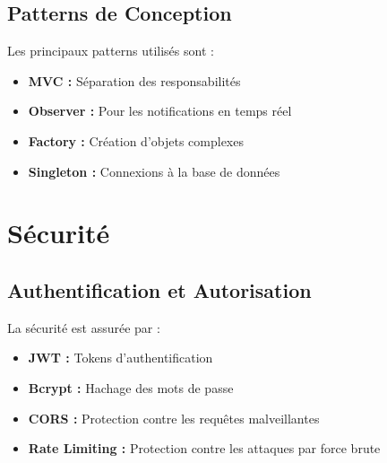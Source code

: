 \subsection{Patterns de Conception}
Les principaux patterns utilisés sont :

\begin{itemize}
    \item \textbf{MVC :} Séparation des responsabilités
    \item \textbf{Observer :} Pour les notifications en temps réel
    \item \textbf{Factory :} Création d'objets complexes
    \item \textbf{Singleton :} Connexions à la base de données
\end{itemize}

\section{Sécurité}
\subsection{Authentification et Autorisation}
La sécurité est assurée par :

\begin{itemize}
    \item \textbf{JWT :} Tokens d'authentification
    \item \textbf{Bcrypt :} Hachage des mots de passe
    \item \textbf{CORS :} Protection contre les requêtes malveillantes
    \item \textbf{Rate Limiting :} Protection contre les attaques par force brute
\end{itemize} 